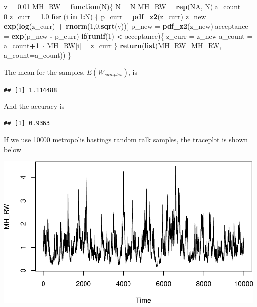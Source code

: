 \documentclass[]{article}
\newenvironment{Shaded}{\begin{snugshade}}{\end{snugshade}}
\newcommand{\KeywordTok}[1]{\textcolor[rgb]{0.13,0.29,0.53}{\textbf{#1}}}
\newcommand{\DataTypeTok}[1]{\textcolor[rgb]{0.13,0.29,0.53}{#1}}
\newcommand{\DecValTok}[1]{\textcolor[rgb]{0.00,0.00,0.81}{#1}}
\newcommand{\FloatTok}[1]{\textcolor[rgb]{0.00,0.00,0.81}{#1}}
\newcommand{\StringTok}[1]{\textcolor[rgb]{0.31,0.60,0.02}{#1}}
\newcommand{\OtherTok}[1]{\textcolor[rgb]{0.56,0.35,0.01}{#1}}
\newcommand{\ControlFlowTok}[1]{\textcolor[rgb]{0.13,0.29,0.53}{\textbf{#1}}}
\newcommand{\OperatorTok}[1]{\textcolor[rgb]{0.81,0.36,0.00}{\textbf{#1}}}
\newcommand{\NormalTok}[1]{#1}
\begin{document}
\begin{Shaded}
\begin{Highlighting}[]
\NormalTok{v =}\StringTok{ }\FloatTok{0.01}
\NormalTok{MH_RW =}\StringTok{ }\ControlFlowTok{function}\NormalTok{(N)\{}
\NormalTok{  N =}\StringTok{ }\NormalTok{N}
\NormalTok{  MH_RW =}\StringTok{ }\KeywordTok{rep}\NormalTok{(}\OtherTok{NA}\NormalTok{, N)}
\NormalTok{  a_count =}\StringTok{ }\DecValTok{0}
\NormalTok{  z_curr =}\StringTok{ }\FloatTok{1.0}
  \ControlFlowTok{for}\NormalTok{ (i }\ControlFlowTok{in} \DecValTok{1}\OperatorTok{:}\NormalTok{N) \{}
\NormalTok{    p_curr =}\StringTok{ }\KeywordTok{pdf_z2}\NormalTok{(z_curr)}
\NormalTok{    z_new =}\StringTok{ }\KeywordTok{exp}\NormalTok{(}\KeywordTok{log}\NormalTok{(z_curr) }\OperatorTok{+}\StringTok{ }\KeywordTok{rnorm}\NormalTok{(}\DecValTok{1}\NormalTok{,}\DecValTok{0}\NormalTok{,}\KeywordTok{sqrt}\NormalTok{(v)))}
\NormalTok{    p_new =}\StringTok{ }\KeywordTok{pdf_z2}\NormalTok{(z_new)}
\NormalTok{    acceptance =}\StringTok{ }\KeywordTok{exp}\NormalTok{(p_new }\OperatorTok{-}\StringTok{ }\NormalTok{p_curr)}
    \ControlFlowTok{if}\NormalTok{(}\KeywordTok{runif}\NormalTok{(}\DecValTok{1}\NormalTok{) }\OperatorTok{<}\StringTok{ }\NormalTok{acceptance)\{}
\NormalTok{      z_curr =}\StringTok{ }\NormalTok{z_new}
\NormalTok{      a_count =}\StringTok{ }\NormalTok{a_count}\OperatorTok{+}\DecValTok{1}
\NormalTok{    \}}
\NormalTok{    MH_RW[i] =}\StringTok{ }\NormalTok{z_curr}
\NormalTok{  \}}
  \KeywordTok{return}\NormalTok{(}\KeywordTok{list}\NormalTok{(}\DataTypeTok{MH_RW=}\NormalTok{MH_RW, }\DataTypeTok{a_count=}\NormalTok{a_count))}
\NormalTok{\}}
\end{Highlighting}
\end{Shaded}

The mean for the samples, \(E(W_{samples})\), is

\begin{verbatim}
## [1] 1.114488
\end{verbatim}

And the accuracy is

\begin{verbatim}
## [1] 0.9363
\end{verbatim}

If we use 10000 metropolis hastings random ralk samples, the traceplot
is shown below

\includegraphics{AMS206b_H4_files/figure-latex/unnamed-chunk-11-1.pdf}
\end{document}
